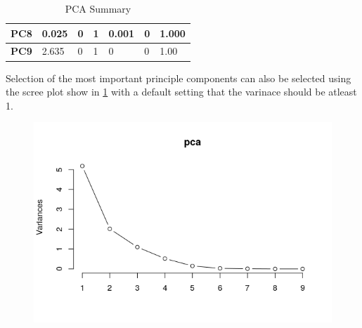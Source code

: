 \documentclass[12pt,a4paper]{article}
\begin{document}
\begin{enumerate}[label=\roman*)]
\begin{table}[h]
\begin{tabular}{|l|l|l|l|l|l|l|}
	\textbf{PC8}       & 0.025            & 0                                                                          & 1                                                                         & 0.001            & 0                                                                          & 1.000                                                                     \\ \hline
	\textbf{PC9}       & 2.635            & 0                                                                          & 1                                                                         & 0                & 0                                                                          & 1.00                                                                      \\ \hline
	\end{tabular}
\caption{PCA Summary}
\label{ps1}
\end{table}

\noindent Selection of the most important principle components can also be selected using the scree plot show in \ref{fig:screep} with a default setting that the varinace should be atleast 1.


\begin{figure}[h]
	\centering
	\includegraphics[width=0.7\linewidth]{ScreeP}
	\caption{}
	\label{fig:screep}
\end{figure}


\end{enumerate}
\end{document}
